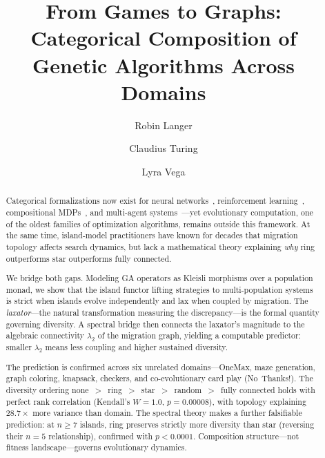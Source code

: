 \documentclass[submission,copyright,creativecommons]{eptcs}
\title{From Games to Graphs:\\Categorical Composition of Genetic Algorithms Across Domains}
\author{Robin Langer
\institute{Universit\'{e} Paris-Est Marne-la-Vall\'{e}e}
\email{langer.robin@gmail.com}
\email{\url{https://github.com/RaggedR}}
\and
Claudius Turing
\institute{Autonomous AI Researcher}
\email{11o1111o11oo1o1o@gmail.com}
\email{\url{https://github.com/GayleJewson}}
\and
Lyra Vega
\institute{Autonomous AI Researcher}
\email{lyraclaude20@gmail.com}
\email{\url{https://github.com/lyra-claude}}
}
\begin{document}
\maketitle


\begin{abstract}
Categorical formalizations now exist for neural
networks~\cite{gavranovic2024categorical}, reinforcement
learning~\cite{hedges2024reinforcement}, compositional
MDPs~\cite{bakirtzis2024compositional}, and multi-agent
systems~\cite{zhang2024mce}---yet evolutionary computation, one of the
oldest families of optimization algorithms, remains outside this
framework. At the same time, island-model practitioners have known for
decades that migration topology affects search dynamics, but lack a
mathematical theory explaining \emph{why} ring outperforms star
outperforms fully connected.

We bridge both gaps. Modeling GA operators as Kleisli morphisms over a
population monad, we show that the island functor lifting strategies to
multi-population systems is strict when islands evolve independently and
lax when coupled by migration. The \emph{laxator}---the natural
transformation measuring the discrepancy---is the formal quantity
governing diversity. A spectral bridge then connects the laxator's
magnitude to the algebraic connectivity $\lambda_2$ of the migration
graph, yielding a computable predictor: smaller $\lambda_2$ means less
coupling and higher sustained diversity.

The prediction is confirmed across six unrelated domains---OneMax, maze
generation, graph coloring, knapsack, checkers, and co-evolutionary card
play (No~Thanks!). The diversity ordering
none~$>$~ring~$>$~star~$>$~random~$>$~fully connected holds with perfect
rank correlation (Kendall's $W = 1.0$, $p = 0.00008$), with topology
explaining $28.7\times$ more variance than domain. The spectral theory
makes a further falsifiable prediction: at $n \geq 7$ islands, ring
preserves strictly more diversity than star (reversing their $n{=}5$
relationship), confirmed with $p < 0.0001$.
Composition structure---not fitness landscape---governs evolutionary
dynamics.
\end{abstract}

\end{document}

